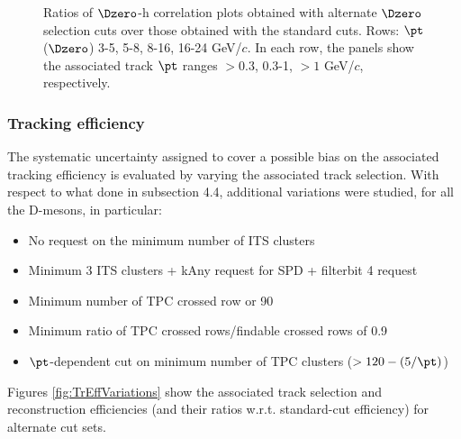 \begin{figure}
 \caption{Ratios of $\Dzero$-h correlation plots obtained with alternate $\Dzero$ selection cuts over those obtained with the standard cuts. Rows: $\pt$($\Dzero$) 3-5, 5-8, 8-16, 16-24 GeV/$c$. In each row, the panels show the associated track
$\pt$ ranges $> 0.3$, 0.3-1, $> 1$ GeV/$c$, respectively.}
\label{fig:SysDcut60100}
\end{figure}

\subsubsection{Tracking efficiency}
The systematic uncertainty assigned to cover a possible bias on the associated tracking efficiency is evaluated by varying the associated track selection.
With respect to what done in subsection 4.4, additional variations were studied, for all the D-mesons, in particular:
\begin{itemize}
  \item No request on the minimum number of ITS clusters
  \item Minimum 3 ITS clusters + kAny request for SPD + filterbit 4 request
  \item Minimum number of TPC crossed row or 90
  \item Minimum ratio of TPC crossed rows/findable crossed rows of 0.9
  \item $\pt$-dependent cut on minimum number of TPC clusters ($> 120-(5/\pt)$)
\end{itemize}

Figures \ref{fig:TrEffVariations} show the associated track selection and reconstruction efficiencies (and their ratios w.r.t. standard-cut efficiency) for alternate cut sets.

